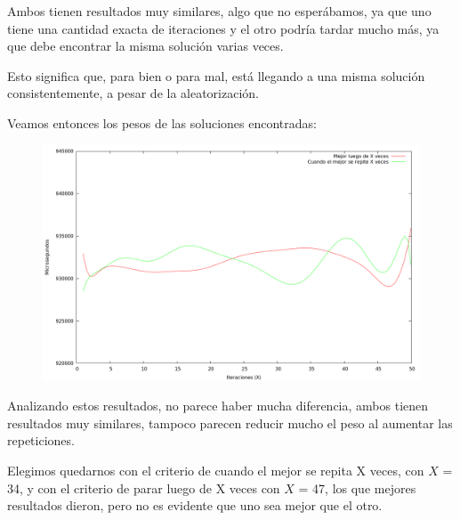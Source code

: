 \vspace*{0.5cm}

Ambos tienen resultados muy similares, algo que no esperábamos, ya que uno tiene
una cantidad exacta de iteraciones y el otro podría tardar mucho más, ya que
debe encontrar la misma solución varias veces.

Esto significa que, para bien o para mal, está llegando a una misma solución
consistentemente, a pesar de la aleatorización.

Veamos entonces los pesos de las soluciones encontradas:

\vspace*{0.5cm}

\begin{figure}[H]
  \begin{center}
    \includegraphics[scale=0.35]{imagenes/grasp-criterio-peso.png}
  \end{center}
\end{figure}

\vspace*{0.5cm}

Analizando estos resultados, no parece haber mucha diferencia, ambos tienen
resultados muy similares, tampoco parecen reducir mucho el peso al
aumentar las repeticiones.

Elegimos quedarnos con el criterio de cuando el mejor se repita X veces, con
$X$ = 34, y con el criterio de parar luego de X veces con $X$ = 47, los que
mejores resultados dieron, pero no es evidente que uno sea mejor que el otro.
